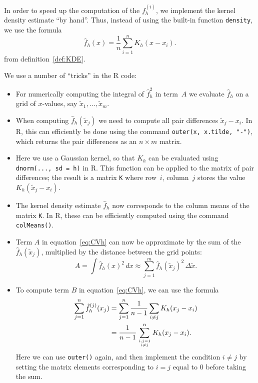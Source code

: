 \documentclass[
  a4paper,
]{article}
\providecommand{\tightlist}{%
  \setlength{\itemsep}{0pt}\setlength{\parskip}{0pt}}
\theoremstyle{definition}
\theoremstyle{definition}
\theoremstyle{definition}
\theoremstyle{definition}
\theoremstyle{remark}
\begin{document}
In order to speed up the computation of the \(f_h^{(i)}\), we implement
the kernel density estimate ``by hand''. Thus, instead of using the built-in
function \texttt{density}, we use the formula
\begin{equation*}
  \hat f_h(x)
  = \frac{1}{n} \sum_{i=1}^n K_h(x - x_i).
\end{equation*}
from definition~\ref{def:KDE}.

We use a number of ``tricks'' in the R code:

\begin{itemize}
\tightlist
\item
  For numerically computing the integral of \(\hat f_h^2\) in term~\(A\)
  we evaluate \(\hat f_h\) on a grid of \(x\)-values,
  say \(\tilde x_1, \ldots, \tilde x_m\).
\item
  When computing \(\hat f_h(\tilde x_j)\)
  we need to compute all pair differences \(\tilde x_j - x_i\). In R, this can
  efficiently be done using the command \texttt{outer(x,\ x.tilde,\ "-")},
  which returns the pair differences as an \(n \times m\) matrix.
\item
  Here we use a Gaussian kernel, so that \(K_h\) can be evaluated using
  \texttt{dnorm(...,\ sd\ =\ h)} in R. This function can be applied to the
  matrix of pair differences; the result is a matrix \texttt{K} where row~\(i\),
  column~\(j\) stores the value \(K_h(\tilde x_j - x_i)\).
\item
  The kernel density estimate \(\hat f_h\) now corresponds to the
  column means of the matrix \texttt{K}. In R, these can be efficiently computed
  using the command \texttt{colMeans()}.
\item
  Term \(A\) in equation~\eqref{eq:CVh} can now be approximate by
  the sum of the \(\hat f_h(\tilde x_j)\), multiplied by the distance
  between the grid points:
  \begin{equation*}
    A
    = \int \hat f_h(x)^2 \,dx
    \approx \sum_{j=1}^m \hat f_h(\tilde x_j)^2  \, \Delta \tilde x.
  \end{equation*}
\item
  To compute term \(B\) in equation~\eqref{eq:CVh}, we can use
  the formula
  \begin{align*}
    \sum_{j=1}^n \hat f_h^{(j)}(x_j)
    &= \sum_{j=1}^n \frac{1}{n-1} \sum_{i\neq j} K_h(x_j - x_i) \\
    &= \frac{1}{n-1} \sum_{i,j=1 \atop i\neq j}^n K_h(x_j - x_i).
  \end{align*}
  Here we can use \texttt{outer()} again, and then implement the condition
  \(i\neq j\) by setting the matrix elements corresponding to \(i=j\)
  equal to 0 before taking the sum.
\end{itemize}
\end{document}
